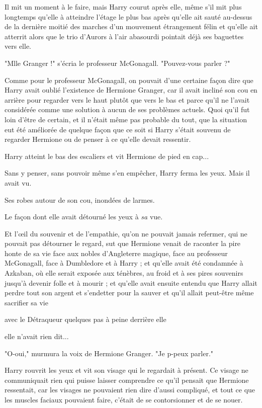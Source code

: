 Il mit un moment à le faire, mais Harry courut après elle, même s'il mit plus longtemps qu'elle à atteindre l'étage le plus bas après qu'elle ait sauté au-dessus de la dernière moitié des marches d'un mouvement étrangement félin et qu'elle ait atterrit alors que le trio d'Aurors à l'air abasourdi pointait déjà ses baguettes vers elle.

"Mlle Granger !" s'écria le professeur McGonagall. "Pouvez-vous parler ?"

Comme pour le professeur McGonagall, on pouvait d'une certaine façon dire que Harry avait oublié l'existence de Hermione Granger, car il avait incliné son cou en arrière pour regarder vers le haut plutôt que vers le bas et parce qu'il ne l'avait considérée comme une solution à aucun de ses problèmes actuels. Quoi qu'il fut loin d'être de certain, et il n'était même pas probable du tout, que la situation eut été améliorée de quelque façon que ce soit si Harry s'était souvenu de regarder Hermione ou de penser à ce qu'elle devait ressentir.

Harry atteint le bas des escaliers et vit Hermione de pied en cap...

Sans y penser, sans pouvoir même s'en empêcher, Harry ferma les yeux. Mais il avait vu.

Ses robes autour de son cou, inondées de larmes.

Le façon dont elle avait détourné les yeux à \emph{sa}  vue.

Et l'œil du souvenir et de l'empathie, qu'on ne pouvait jamais refermer, qui ne pouvait pas détourner le regard, sut que Hermione venait de raconter la pire honte de sa vie face aux nobles d'Angleterre magique, face au professeur McGonagall, face à Dumbledore et à Harry ; et qu'elle avait été condamnée à Azkaban, où elle serait exposée aux ténèbres, au froid et à ses pires souvenirs jusqu'à devenir folle et à mourir ; et qu'elle avait ensuite entendu que Harry allait perdre tout son argent et s'endetter pour la sauver et qu'il allait peut-être même sacrifier sa vie

avec le Détraqueur quelques pas à peine derrière elle

elle n'avait rien dit...

"O-oui," murmura la voix de Hermione Granger. "Je p-peux parler."

Harry rouvrit les yeux et vit son visage qui le regardait à présent. Ce visage ne communiquait rien qui puisse laisser comprendre ce qu'il pensait que Hermione ressentait, car les visages ne pouvaient rien dire d'aussi compliqué, et tout ce que les muscles faciaux pouvaient faire, c'était de se contorsionner et de se nouer.

